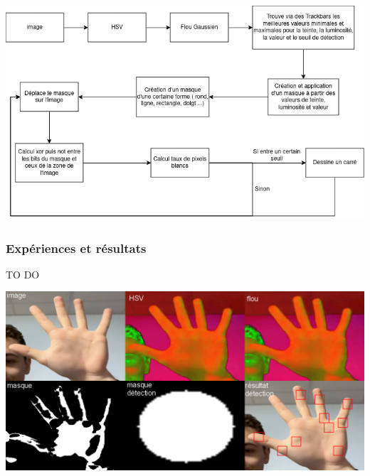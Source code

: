 \documentclass[11pt]{article}
\begin{document}
\begin{center}
    \includegraphics[width=\textwidth]{images/pipeline_detect_fingers_sans_convex_hull.png}
    \label{fig:pipeline_detect_fingers_sans_convex_hull}
\end{center}

\subsubsection{Expériences et résultats}

{\LARGE TO DO}
\begin{center}
    \includegraphics[width=\textwidth]{images/detect_fingers_mask_4.png}
    \label{fig:detect_fingers_mask_4}
\end{center}
\end{document}
